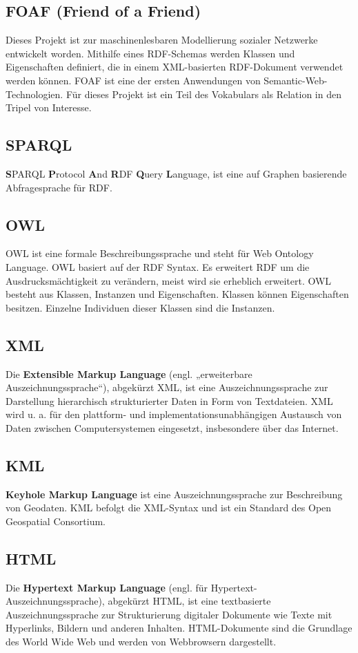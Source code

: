 \documentclass[11pt,a4paper]{article}
\begin{document}
\subsection{FOAF (Friend of a Friend)}
Dieses  Projekt ist zur maschinenlesbaren Modellierung sozialer Netzwerke  entwickelt worden. Mithilfe eines RDF-Schemas werden Klassen und  Eigenschaften definiert, die in einem XML-basierten RDF-Dokument  verwendet werden können. FOAF ist eine der ersten Anwendungen von  Semantic-Web-Technologien.
Für dieses Projekt ist ein Teil des Vokabulars als Relation in den Tripel von Interesse.
\subsection{SPARQL}
\textbf{S}PARQL \textbf{P}rotocol \textbf{A}nd \textbf{R}DF \textbf{Q}uery \textbf{L}anguage, ist eine auf Graphen basierende Abfragesprache für RDF.
\subsection{OWL}
OWL ist eine formale Beschreibungssprache und steht für Web Ontology Language. OWL basiert auf der RDF Syntax. Es erweitert RDF um die Ausdrucksmächtigkeit zu verändern, meist wird sie erheblich erweitert. OWL besteht aus Klassen, Instanzen und Eigenschaften. Klassen können Eigenschaften besitzen. Einzelne Individuen dieser Klassen sind die Instanzen.

\subsection{XML}
Die \textbf{Extensible Markup Language} (engl. „erweiterbare Auszeichnungssprache“), abgekürzt XML, ist eine Auszeichnungssprache zur Darstellung hierarchisch strukturierter Daten in Form von Textdateien. XML wird u. a. für den plattform- und implementationsunabhängigen Austausch von Daten zwischen Computersystemen eingesetzt, insbesondere über das Internet.


\subsection{KML}
\textbf{Keyhole Markup Language} ist eine Auszeichnungssprache zur Beschreibung von Geodaten. KML befolgt die XML-Syntax und ist ein Standard des Open Geospatial Consortium.

\subsection{HTML}
Die \textbf{Hypertext Markup Language} (engl. für Hypertext-Auszeichnungssprache), abgekürzt HTML, ist eine textbasierte Auszeichnungssprache zur Strukturierung digitaler Dokumente wie Texte mit Hyperlinks, Bildern und anderen Inhalten. HTML-Dokumente sind die Grundlage des World Wide Web und werden von Webbrowsern dargestellt.
\end{document}
